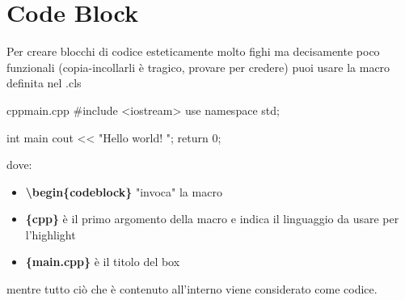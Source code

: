 \chapter{Code Block}

Per creare blocchi di codice esteticamente molto fighi ma decisamente poco funzionali (copia-incollarli è tragico, provare per credere) puoi usare la macro definita nel .cls 

\begin{codeblock}{cpp}{main.cpp}
#include <iostream>
use namespace std;

int main{
    cout << "Hello world! \n";
    return 0;
}
\end{codeblock}

dove:
\begin{itemize}
    \item \textbf{\textbackslash begin\{codeblock\}} "invoca" la macro
    \item \textbf{\{cpp\}} è il primo argomento della macro e indica il linguaggio da usare per l'highlight
    \item \textbf{\{main.cpp\}} è il titolo del box
\end{itemize}

mentre tutto ciò che è contenuto all'interno viene considerato come codice.
